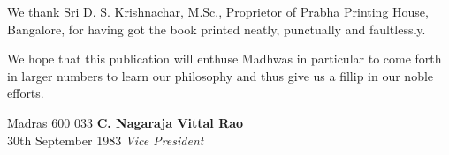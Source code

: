 We thank Sri D. S. Krishnachar, M.Sc., Proprietor of Prabha Printing House, Bangalore, for having got the book printed neatly, punctually and faultlessly.

We hope that this publication will enthuse Madhwas in particular to come forth in larger numbers to learn our philosophy and thus give us a fillip in our noble efforts.

\vskip 1cm

\noindent
Madras 600 033 \hfill \textbf{C. Nagaraja Vittal Rao}\\ 30th September 1983 \hfill \textit{Vice \enginline{-}President}

